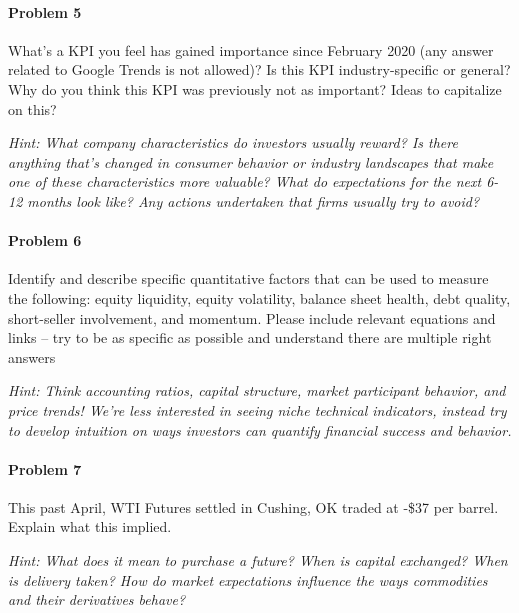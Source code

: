 \documentclass[
]{article}
\begin{document}
\hypertarget{problem-5}{%
\paragraph{Problem 5}\label{problem-5}}

What's a KPI you feel has gained importance since February 2020 (any
answer related to Google Trends is not allowed)? Is this KPI
industry-specific or general? Why do you think this KPI was previously
not as important? Ideas to capitalize on this?

\emph{Hint: What company characteristics do investors usually reward? Is
there anything that's changed in consumer behavior or industry
landscapes that make one of these characteristics more valuable? What do
expectations for the next 6-12 months look like? Any actions undertaken
that firms usually try to avoid?}

\hypertarget{problem-6}{%
\paragraph{Problem 6}\label{problem-6}}

Identify and describe specific quantitative factors that can be used to
measure the following: equity liquidity, equity volatility, balance
sheet health, debt quality, short-seller involvement, and momentum.
Please include relevant equations and links -- try to be as specific as
possible and understand there are multiple right answers

\emph{Hint: Think accounting ratios, capital structure, market
participant behavior, and price trends! We're less interested in seeing
niche technical indicators, instead try to develop intuition on ways
investors can quantify financial success and behavior.}

\hypertarget{problem-7}{%
\paragraph{Problem 7}\label{problem-7}}

This past April, WTI Futures settled in Cushing, OK traded at -\$37 per
barrel. Explain what this implied.

\emph{Hint: What does it mean to purchase a future? When is capital
exchanged? When is delivery taken? How do market expectations influence
the ways commodities and their derivatives behave?}
\end{document}
